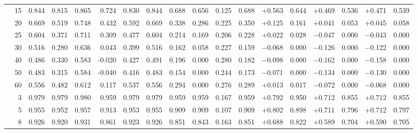 \begin{table}[ht]
{\begin{tabular}{p{2.2cm}r rrrr rr rr rr rr rr rr}
  & 15 & 0.844 & 0.815 & 0.865 & 0.724 & 0.830 & 0.844 & 0.688 & 0.656 & 0.125 & 0.688 & $+$0.563 & 0.644 & $+$0.469 & 0.536 & $+$0.471 & 0.539 \\
  & 20 & 0.669 & 0.519 & 0.748 & 0.432 & 0.592 & 0.669 & 0.338 & 0.286 & 0.225 & 0.350 & $+$0.125 & 0.161 & $+$0.041 & 0.053 & $+$0.045 & 0.058 \\
  & 25 & 0.604 & 0.371 & 0.711 & 0.309 & 0.477 & 0.604 & 0.214 & 0.169 & 0.206 & 0.228 & $+$0.022 & 0.028 & $-$0.047 & 0.000 & $-$0.043 & 0.000 \\
  & 30 & 0.516 & 0.280 & 0.636 & 0.043 & 0.399 & 0.516 & 0.162 & 0.058 & 0.227 & 0.159 & $-$0.068 & 0.000 & $-$0.126 & 0.000 & $-$0.122 & 0.000 \\
  & 40 & 0.486 & 0.330 & 0.583 & -0.020 & 0.427 & 0.491 & 0.196 & 0.000 & 0.280 & 0.182 & $-$0.098 & 0.000 & $-$0.162 & 0.000 & $-$0.158 & 0.000 \\
  & 50 & 0.483 & 0.315 & 0.584 & -0.040 & 0.416 & 0.483 & 0.154 & 0.000 & 0.244 & 0.173 & $-$0.071 & 0.000 & $-$0.134 & 0.000 & $-$0.130 & 0.000 \\
  & 60 & 0.556 & 0.482 & 0.612 & 0.117 & 0.537 & 0.556 & 0.294 & 0.000 & 0.276 & 0.289 & $+$0.013 & 0.017 & $-$0.072 & 0.000 & $-$0.068 & 0.000 \\
\midrule
{}
  & 3  & 0.979 & 0.979 & 0.980 & 0.959 & 0.979 & 0.979 & 0.959 & 0.959 & 0.167 & 0.959 & $+$0.792 & 0.950 & $+$0.712 & 0.855 & $+$0.712 & 0.855 \\
  & 5  & 0.955 & 0.952 & 0.957 & 0.913 & 0.953 & 0.955 & 0.909 & 0.909 & 0.107 & 0.909 & $+$0.802 & 0.898 & $+$0.711 & 0.796 & $+$0.712 & 0.797 \\
  & 8  & 0.926 & 0.920 & 0.931 & 0.861 & 0.923 & 0.926 & 0.851 & 0.843 & 0.163 & 0.851 & $+$0.688 & 0.822 & $+$0.589 & 0.704 & $+$0.590 & 0.705 \\

\end{tabular}}
\end{table}
